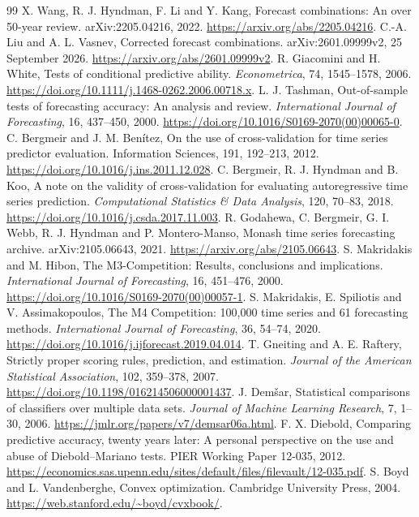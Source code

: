 \documentclass[11pt,a4paper]{article}
\begin{document}
\begin{thebibliography}{99}
 X. Wang, R. J. Hyndman, F. Li and Y. Kang, Forecast combinations: An over 50-year review. arXiv:2205.04216, 2022. \url{https://arxiv.org/abs/2205.04216}.
 C.-A. Liu and A. L. Vasnev, Corrected forecast combinations. arXiv:2601.09999v2, 25 September 2026. \url{https://arxiv.org/abs/2601.09999v2}.
 R. Giacomini and H. White, Tests of conditional predictive ability. \emph{Econometrica}, 74, 1545--1578, 2006. \url{https://doi.org/10.1111/j.1468-0262.2006.00718.x}.
 L. J. Tashman, Out-of-sample tests of forecasting accuracy: An analysis and review. \emph{International Journal of Forecasting}, 16, 437--450, 2000. \url{https://doi.org/10.1016/S0169-2070(00)00065-0}.
 C. Bergmeir and J. M. Ben\'itez, On the use of cross-validation for time series predictor evaluation. Information Sciences, 191, 192--213, 2012. \url{https://doi.org/10.1016/j.ins.2011.12.028}.
 C. Bergmeir, R. J. Hyndman and B. Koo, A note on the validity of cross-validation for evaluating autoregressive time series prediction. \emph{Computational Statistics \& Data Analysis}, 120, 70--83, 2018. \url{https://doi.org/10.1016/j.csda.2017.11.003}.
 R. Godahewa, C. Bergmeir, G. I. Webb, R. J. Hyndman and P. Montero-Manso, Monash time series forecasting archive. arXiv:2105.06643, 2021. \url{https://arxiv.org/abs/2105.06643}.
 S. Makridakis and M. Hibon, The M3-Competition: Results, conclusions and implications. \emph{International Journal of Forecasting}, 16, 451--476, 2000. \url{https://doi.org/10.1016/S0169-2070(00)00057-1}.
 S. Makridakis, E. Spiliotis and V. Assimakopoulos, The M4 Competition: 100,000 time series and 61 forecasting methods. \emph{International Journal of Forecasting}, 36, 54--74, 2020. \url{https://doi.org/10.1016/j.ijforecast.2019.04.014}.
 T. Gneiting and A. E. Raftery, Strictly proper scoring rules, prediction, and estimation. \emph{Journal of the American Statistical Association}, 102, 359--378, 2007. \url{https://doi.org/10.1198/016214506000001437}.
 J. Dem\v{s}ar, Statistical comparisons of classifiers over multiple data sets. \emph{Journal of Machine Learning Research}, 7, 1--30, 2006. \url{https://jmlr.org/papers/v7/demsar06a.html}.
 F. X. Diebold, Comparing predictive accuracy, twenty years later: A personal perspective on the use and abuse of Diebold--Mariano tests. PIER Working Paper 12-035, 2012. \url{https://economics.sas.upenn.edu/sites/default/files/filevault/12-035.pdf}.
 S. Boyd and L. Vandenberghe, Convex optimization. Cambridge University Press, 2004. \url{https://web.stanford.edu/~boyd/cvxbook/}.
\end{thebibliography}
\end{document}
